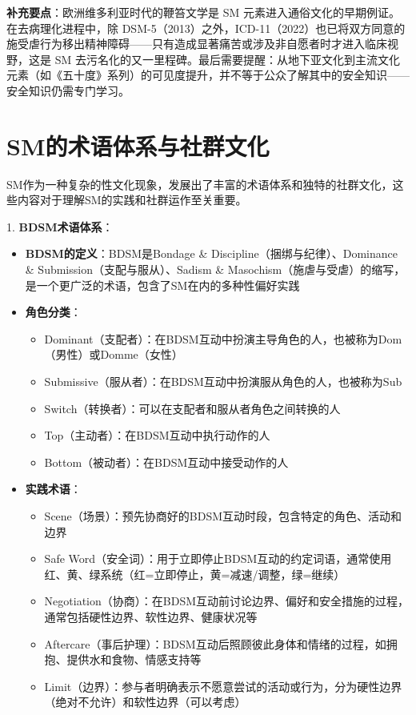 \documentclass[12pt,UTF8]{ctexbook}
\begin{document}
\noindent\textbf{补充要点}：欧洲维多利亚时代的鞭笞文学是 SM 元素进入通俗文化的早期例证。在去病理化进程中，除 DSM-5（2013）之外，ICD-11\cite{who2019icd11}（2022）也已将双方同意的施受虐行为移出精神障碍——只有造成显著痛苦或涉及非自愿者时才进入临床视野，这是 SM 去污名化的又一里程碑。最后需要提醒：从地下亚文化到主流文化元素（如《五十度》系列）的可见度提升，并不等于公众了解其中的安全知识——安全知识仍需专门学习。

\section{SM的术语体系与社群文化}

SM作为一种复杂的性文化现象，发展出了丰富的术语体系和独特的社群文化，这些内容对于理解SM的实践和社群运作至关重要。

1. \textbf{BDSM术语体系}：
  \begin{itemize}
  \item \textbf{BDSM的定义}：BDSM是Bondage \& Discipline（捆绑与纪律）、Dominance \& Submission（支配与服从）、Sadism \& Masochism（施虐与受虐）的缩写，是一个更广泛的术语，包含了SM在内的多种性偏好实践
  \item \textbf{角色分类}：
    \begin{itemize}
    \item Dominant（支配者）：在BDSM互动中扮演主导角色的人，也被称为Dom（男性）或Domme（女性）
    \item Submissive（服从者）：在BDSM互动中扮演服从角色的人，也被称为Sub
    \item Switch（转换者）：可以在支配者和服从者角色之间转换的人
    \item Top（主动者）：在BDSM互动中执行动作的人
    \item Bottom（被动者）：在BDSM互动中接受动作的人
    \end{itemize}
  \item \textbf{实践术语}：
    \begin{itemize}
    \item Scene（场景）：预先协商好的BDSM互动时段，包含特定的角色、活动和边界
    \item Safe Word（安全词）：用于立即停止BDSM互动的约定词语，通常使用红、黄、绿系统（红=立即停止，黄=减速/调整，绿=继续）
    \item Negotiation（协商）：在BDSM互动前讨论边界、偏好和安全措施的过程，通常包括硬性边界、软性边界、健康状况等
    \item Aftercare（事后护理）：BDSM互动后照顾彼此身体和情绪的过程，如拥抱、提供水和食物、情感支持等
    \item Limit（边界）：参与者明确表示不愿意尝试的活动或行为，分为硬性边界（绝对不允许）和软性边界（可以考虑）

\end{itemize}
\end{itemize}
\end{document}
